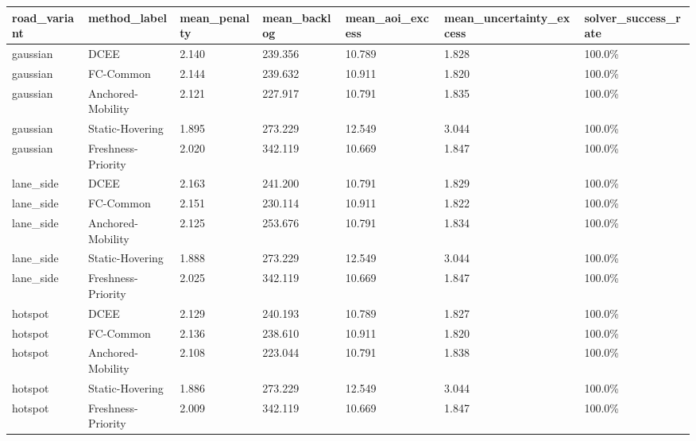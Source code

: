 \begin{tabular}{lllllll}
\toprule
road_variant & method_label & mean_penalty & mean_backlog & mean_aoi_excess & mean_uncertainty_excess & solver_success_rate \\
\midrule
gaussian & DCEE & 2.140 & 239.356 & 10.789 & 1.828 & 100.0\% \\
gaussian & FC-Common & 2.144 & 239.632 & 10.911 & 1.820 & 100.0\% \\
gaussian & Anchored-Mobility & 2.121 & 227.917 & 10.791 & 1.835 & 100.0\% \\
gaussian & Static-Hovering & 1.895 & 273.229 & 12.549 & 3.044 & 100.0\% \\
gaussian & Freshness-Priority & 2.020 & 342.119 & 10.669 & 1.847 & 100.0\% \\
lane_side & DCEE & 2.163 & 241.200 & 10.791 & 1.829 & 100.0\% \\
lane_side & FC-Common & 2.151 & 230.114 & 10.911 & 1.822 & 100.0\% \\
lane_side & Anchored-Mobility & 2.125 & 253.676 & 10.791 & 1.834 & 100.0\% \\
lane_side & Static-Hovering & 1.888 & 273.229 & 12.549 & 3.044 & 100.0\% \\
lane_side & Freshness-Priority & 2.025 & 342.119 & 10.669 & 1.847 & 100.0\% \\
hotspot & DCEE & 2.129 & 240.193 & 10.789 & 1.827 & 100.0\% \\
hotspot & FC-Common & 2.136 & 238.610 & 10.911 & 1.820 & 100.0\% \\
hotspot & Anchored-Mobility & 2.108 & 223.044 & 10.791 & 1.838 & 100.0\% \\
hotspot & Static-Hovering & 1.886 & 273.229 & 12.549 & 3.044 & 100.0\% \\
hotspot & Freshness-Priority & 2.009 & 342.119 & 10.669 & 1.847 & 100.0\% \\
\bottomrule
\end{tabular}
